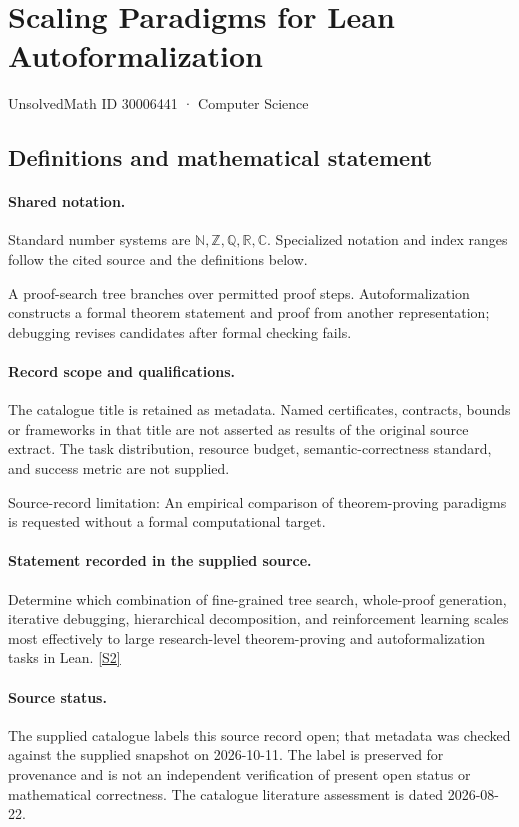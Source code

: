 \documentclass[11pt]{article}
\newcommand{\sref}[2]{\hyperlink{source:#1:#2}{[S#2]}}
\begin{document}
\setcounter{section}{30006440}
\section{Scaling Paradigms for Lean Autoformalization}\label{30006441}
{\small\sffamily UnsolvedMath ID 30006441 · Computer Science}
\subsection{Definitions and mathematical statement}

\paragraph{Shared notation.}Standard number systems are $\mathbb N,\mathbb Z,\mathbb Q,\mathbb R,\mathbb C$. Specialized notation and index ranges follow the cited source and the definitions below.


A proof-search tree branches over permitted proof steps. Autoformalization constructs a formal theorem statement and proof from another representation; debugging revises candidates after formal checking fails.
\paragraph{Record scope and qualifications.}
The catalogue title is retained as metadata. Named certificates, contracts, bounds or frameworks in that title are not asserted as results of the original source extract.
The task distribution, resource budget, semantic-correctness standard, and success metric are not supplied.

Source-record limitation: An empirical comparison of theorem-proving paradigms is requested without a formal computational target.
\paragraph{Statement recorded in the supplied source.}
Determine which combination of fine-grained tree search, whole-proof generation, iterative debugging, hierarchical decomposition, and reinforcement learning scales most effectively to large research-level theorem-proving and autoformalization tasks in Lean. \sref{30006441}{2}
\paragraph{Source status.}
The supplied catalogue labels this source record open; that metadata was checked against the supplied snapshot on 2026-10-11. The label is preserved for provenance and is not an independent verification of present open status or mathematical correctness. The catalogue literature assessment is dated 2026-08-22.
\end{document}
